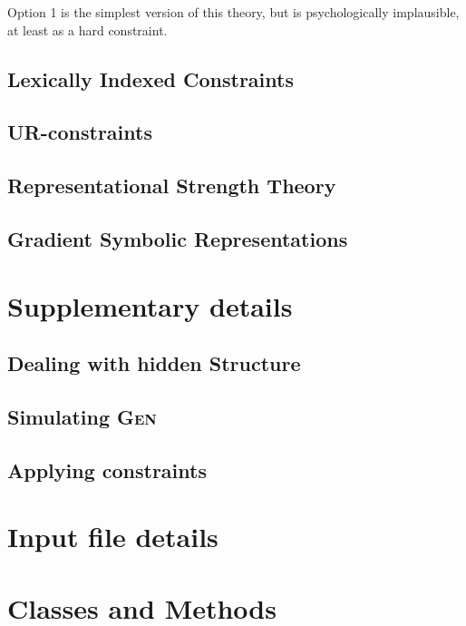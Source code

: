 \documentclass[12]{article}
\begin{document}
		Option 1 is the simplest version of this theory, but is psychologically implausible, at least as a hard constraint.  

	\subsection{Lexically Indexed Constraints}

	\subsection{UR-constraints}

	\subsection{Representational Strength Theory}

	\subsection{Gradient Symbolic Representations}


\section{Supplementary details}
	\subsection{Dealing with hidden Structure}
	\subsection{Simulating \textsc{Gen}}
	\subsection{Applying constraints}

\section{Input file details}

\section{Classes and Methods}
\end{document}

